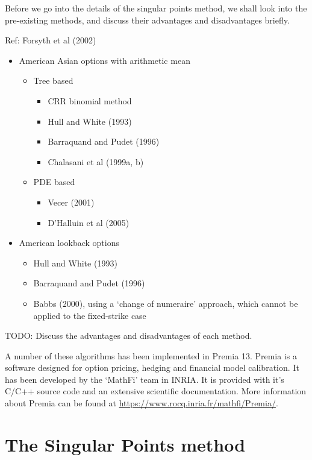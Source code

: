 Before we go into the details of the singular points method, we shall look into the pre-existing methods, and discuss their advantages and disadvantages briefly.

Ref: Forsyth et al (2002)

\begin{itemize}
\item American Asian options with arithmetic mean
	\begin{itemize}
	\item Tree based
		\begin{itemize}
		\item CRR binomial method
		\item Hull and White (1993)
		\item Barraquand and Pudet (1996)
		\item Chalasani et al (1999a, b)
		\end{itemize}
	\item PDE based
		\begin{itemize}
		\item Vecer (2001)
		\item D’Halluin et al (2005)
		\end{itemize}
	\end{itemize}
\item American lookback options
	\begin{itemize}
	\item Hull and White (1993)
	\item Barraquand and Pudet (1996)
	\item Babbs (2000), using a `change of numeraire' approach, which cannot be applied to the fixed-strike case
	\end{itemize}
\end{itemize}

TODO: Discuss the advantages and disadvantages of each method.

A number of these algorithms has been implemented in Premia 13. Premia is a software designed for option pricing, hedging and financial model calibration. It has been developed by the `MathFi' team in INRIA. It is provided with it's C/C++ source code and an extensive scientific documentation. More information about Premia can be found at \url{https://www.rocq.inria.fr/mathfi/Premia/}.



\section{The Singular Points method}
\label{sec:sp-method}

